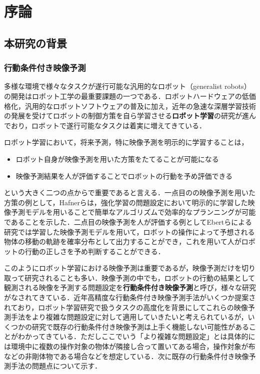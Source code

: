 \chapter{序論}
\label{chap:introduction}
\section{本研究の背景}
\subsection{行動条件付き映像予測}
多様な環境で様々なタスクが遂行可能な汎用的なロボット（generalist robots）の開発はロボット工学の最重要課題の一つである．ロボットハードウェアの低価格化，汎用的なロボットソフトウェアの普及に加え，近年の急速な深層学習技術の発展を受けてロボットの制御方策を自ら学習させる{\bf ロボット学習}の研究が進んでおり，ロボットで遂行可能なタスクは着実に増えてきている．

ロボット学習において，将来予測，特に映像予測を明示的に学習することは，

\begin{itemize}
    \item ロボット自身が映像予測を用いた方策をたてることが可能になる
    \item 映像予測結果を人が評価することでロボットの行動を予め評価できる
\end{itemize}
という大きく二つの点からで重要であると言える．一点目のの映像予測を用いた方策の例として，Hafnerら\cite{hafner2019planet}は，強化学習の問題設定において明示的に学習した映像予測モデルを用いることで簡単なアルゴリズムで効率的なプランニングが可能であることを示した．二点目の映像予測を人が評価する例としてEbertらによる研究\cite{ebert2018visual}では学習した映像予測モデルを用いて，ロボットの操作によって予想される物体の移動の軌跡を確率分布として出力することができ，これを用いて人がロボットの行動の正しさを予め判断することができる．

このようにロボット学習における映像予測は重要であるが，映像予測だけを切り取って研究されることも多い．映像予測の中でも，ロボットの行動の結果として観測される映像を予測する問題設定を{\bf 行動条件付き映像予測}と呼び，様々な研究がなされてきている．近年高精度な行動条件付き映像予測手法がいくつか提案されており，ロボット学習研究で扱うタスクの高度化を背景にしてこれらの映像予測手法をより複雑な問題設定に対して適用していきたいと考えられているが，いくつかの研究で既存の行動条件付き映像予測は上手く機能しない可能性があることがわかってきている．ただしここでいう「より複雑な問題設定」とは具体的には環境中に複数の操作対象の物体が隣接し合って置いてある場合，操作対象が布などの非剛体物である場合などを想定している．次に既存の行動条件付き映像予測手法の問題点について示す．


